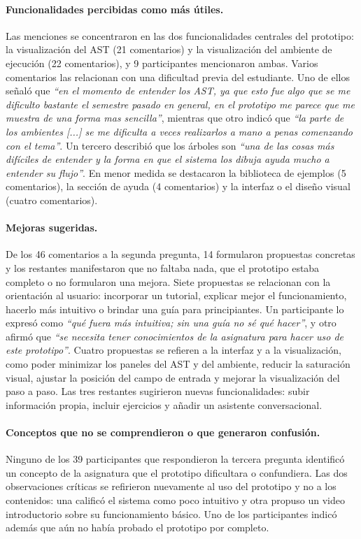 \paragraph{Funcionalidades percibidas como más útiles.} Las menciones se concentraron en las dos funcionalidades centrales del prototipo: la visualización del AST (21 comentarios) y la visualización del ambiente de ejecución (22 comentarios), y 9 participantes mencionaron ambas. Varios comentarios las relacionan con una dificultad previa del estudiante. Uno de ellos señaló que \textit{``en el momento de entender los AST, ya que esto fue algo que se me dificulto bastante el semestre pasado en general, en el prototipo me parece que me muestra de una forma mas sencilla''}, mientras que otro indicó que \textit{``la parte de los ambientes [...] se me dificulta a veces realizarlos a mano a penas comenzando con el tema''}. Un tercero describió que los árboles son \textit{``una de las cosas más difíciles de entender y la forma en que el sistema los dibuja ayuda mucho a entender su flujo''}. En menor medida se destacaron la biblioteca de ejemplos (5 comentarios), la sección de ayuda (4 comentarios) y la interfaz o el diseño visual (cuatro comentarios).

\paragraph{Mejoras sugeridas.} De los 46 comentarios a la segunda pregunta, 14 formularon propuestas concretas y los restantes manifestaron que no faltaba nada, que el prototipo estaba completo o no formularon una mejora. Siete propuestas se relacionan con la orientación al usuario: incorporar un tutorial, explicar mejor el funcionamiento, hacerlo más intuitivo o brindar una guía para principiantes. Un participante lo expresó como \textit{``qué fuera más intuitiva; sin una guía no sé qué hacer''}, y otro afirmó que \textit{``se necesita tener conocimientos de la asignatura para hacer uso de este prototipo''}. Cuatro propuestas se refieren a la interfaz y a la visualización, como poder minimizar los paneles del AST y del ambiente, reducir la saturación visual, ajustar la posición del campo de entrada y mejorar la visualización del paso a paso. Las tres restantes sugirieron nuevas funcionalidades: subir información propia, incluir ejercicios y añadir un asistente conversacional.

\paragraph{Conceptos que no se comprendieron o que generaron confusión.} Ninguno de los 39 participantes que respondieron la tercera pregunta identificó un concepto de la asignatura que el prototipo dificultara o confundiera. Las dos observaciones críticas se refirieron nuevamente al uso del prototipo y no a los contenidos: una calificó el sistema como poco intuitivo y otra propuso un video introductorio sobre su funcionamiento básico. Uno de los participantes indicó además que aún no había probado el prototipo por completo.

